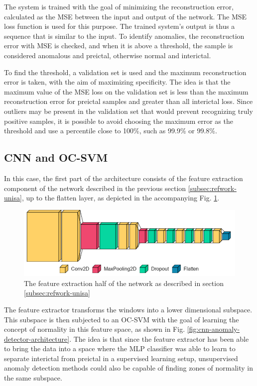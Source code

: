 The system is trained with the goal of minimizing the reconstruction error, calculated as the \gls{MSE} between the input and output of the network. The \gls{MSE} loss function is used for this purpose. 
The trained system's output is thus a sequence that is similar to the input. To identify anomalies, the reconstruction error with \gls{MSE} is checked, and when it is above a threshold, the sample is considered anomalous and preictal, otherwise normal and interictal. 

To find the threshold, a validation set is used and the maximum reconstruction error is taken, with the aim of maximizing specificity. The idea is that the maximum value of the \gls{MSE} loss on the validation set is less than the maximum reconstruction error for preictal samples and greater than all interictal loss. Since outliers may be present in the validation set that would prevent recognizing truly positive samples, it is possible to avoid choosing the maximum error as the threshold and use a percentile close to 100\%, such as 99.9\% or 99.8\%.

\subsection{CNN and OC-SVM} \label{subsec:cnn}
In this case, the first part of the architecture consists of the feature extraction component of the network described in the previous section \ref{subsec:refwork-unisa}, up to the flatten layer, as depicted in the accompanying Fig. \ref{fig:cnn-feature-extractor}.

\begin{figure}[ht]
    \centering
    \includegraphics[width=1.0\textwidth]{images/Contribution/cnn-feature-extractor.png}
    \caption{The feature extraction half of the network as described in section \ref{subsec:refwork-unisa}}
    \label{fig:cnn-feature-extractor}
\end{figure}

The feature extractor transforms the windows into a lower dimensional subspace. This subspace is then subjected to an \gls{OC-SVM} with the goal of learning the concept of normality in this feature space, as shown in Fig. \ref{fig:cnn-anomaly-detector-architecture}. The idea is that since the feature extractor has been able to bring the data into a space where the \gls{MLP} classifier was able to learn to separate interictal from preictal in a supervised learning setup, unsupervised anomaly detection methods could also be capable of finding zones of normality in the same subspace.

